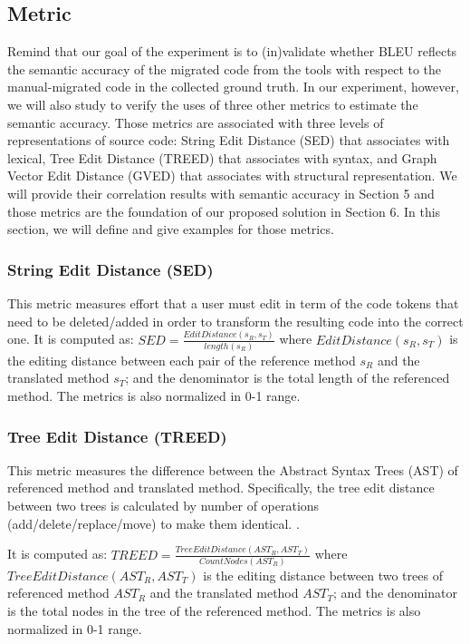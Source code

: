 \subsection{Metric} 
%

Remind that our goal of the experiment is to (in)validate whether BLEU reflects the semantic accuracy of the migrated code from the tools with respect to the manual-migrated code in the collected ground truth. In our experiment, however, we will also study to verify the uses of three other metrics to estimate the semantic accuracy. Those metrics are associated with three levels of representations of source code: String Edit Distance (SED) that associates with lexical, Tree Edit Distance (TREED) that associates with syntax, and Graph Vector Edit Distance (GVED) that associates with structural representation. We will provide their correlation results with semantic accuracy in Section 5 and those metrics are the foundation of our proposed solution in Section 6. In this section, we will define and give examples for those metrics. 
\subsubsection{\textbf{String Edit Distance (SED)}} This metric measures effort that a user must edit in term of the code tokens
that need to be deleted/added in order to transform the
resulting code into the correct one. It is computed as:  $SED = \frac{EditDistance\left(s_R, s_T\right)}{length\left(s_R\right)}$ where $EditDistance\left(s_R, s_T\right)$ is the editing distance between each pair of the reference method $s_R$ and the translated method $s_T$; and the denominator is the total length of the referenced method. The metrics is also normalized in 0-1 range. 

\subsubsection{\textbf{Tree Edit Distance (TREED)}} This metric measures the difference between the Abstract Syntax Trees (AST) of referenced method and translated method. Specifically, the tree edit distance between two trees is calculated by number of operations (add/delete/replace/move) to make them identical. \cite{algorithm}. 

It is computed as:  $TREED = \frac{TreeEditDistance\left(AST_R, AST_T\right)}{CountNodes \left(AST_R\right)}$ where $TreeEditDistance\left(AST_R, AST_T\right)$ is the editing distance between two trees of referenced method $AST_R$ and the translated method $AST_T$; and the denominator is the total nodes in the tree of the referenced method.  The metrics is also normalized in 0-1 range.

